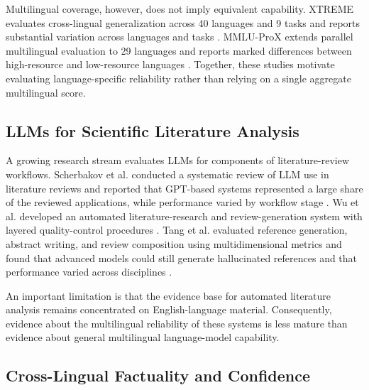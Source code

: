 \documentclass[acmsmall,screen,review]{acmart}
\begin{document}
Multilingual coverage, however, does not imply equivalent capability. XTREME evaluates cross-lingual generalization across 40 languages and 9 tasks and reports substantial variation across languages and tasks \citep{hu2020xtreme}. MMLU-ProX extends parallel multilingual evaluation to 29 languages and reports marked differences between high-resource and low-resource languages \citep{xuan2025mmlupro}. Together, these studies motivate evaluating language-specific reliability rather than relying on a single aggregate multilingual score.


\subsection{LLMs for Scientific Literature Analysis}
\label{sec:lit-review-automation}

A growing research stream evaluates LLMs for components of literature-review workflows. Scherbakov et al. conducted a systematic review of LLM use in literature reviews and reported that GPT-based systems represented a large share of the reviewed applications, while performance varied by workflow stage \citep{scherbakov2025emergence}. Wu et al. developed an automated literature-research and review-generation system with layered quality-control procedures \citep{wu2025automated}. Tang et al. evaluated reference generation, abstract writing, and review composition using multidimensional metrics and found that advanced models could still generate hallucinated references and that performance varied across disciplines \citep{tang2025automated}.

An important limitation is that the evidence base for automated literature analysis remains concentrated on English-language material. Consequently, evidence about the multilingual reliability of these systems is less mature than evidence about general multilingual language-model capability.


\subsection{Cross-Lingual Factuality and Confidence}
\label{sec:factuality-background}
\end{document}
